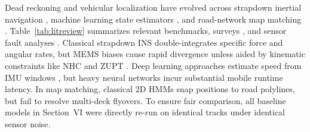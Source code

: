 \documentclass[conference]{IEEEtran}
\begin{document}
Dead reckoning and vehicular localization have evolved across strapdown inertial navigation \cite{dissanayake2001, foxlin2005}, machine learning state estimators \cite{brossard2020, lawal2024, qian2025, mamun2026}, and road-network map matching \cite{newson2009, javed2024, sundar2026}. Table~\ref{tab:litreview} summarizes relevant benchmarks, surveys \cite{deshmukh2025, mamun2026}, and sensor fault analyses \cite{matos2025}. Classical strapdown INS double-integrates specific force and angular rates, but MEMS biases cause rapid divergence unless aided by kinematic constraints like NHC \cite{dissanayake2001} and ZUPT \cite{foxlin2005}. Deep learning approaches estimate speed from IMU windows \cite{brossard2020, qian2025}, but heavy neural networks incur substantial mobile runtime latency. In map matching, classical 2D HMMs \cite{newson2009, javed2024, sundar2026} snap positions to road polylines, but fail to resolve multi-deck flyovers. To ensure fair comparison, all baseline models in Section~VI were directly re-run on identical tracks under identical sensor noise.
\end{document}
